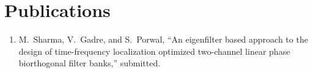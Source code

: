 \chapter*{Publications}
\begin{enumerate}
\item
M.~Sharma, V.~Gadre, and S.~Porwal, ``An eigenfilter based approach to the
  design of time-frequency localization optimized two-channel linear phase
  biorthogonal filter banks,'' submitted.
\end{enumerate}
